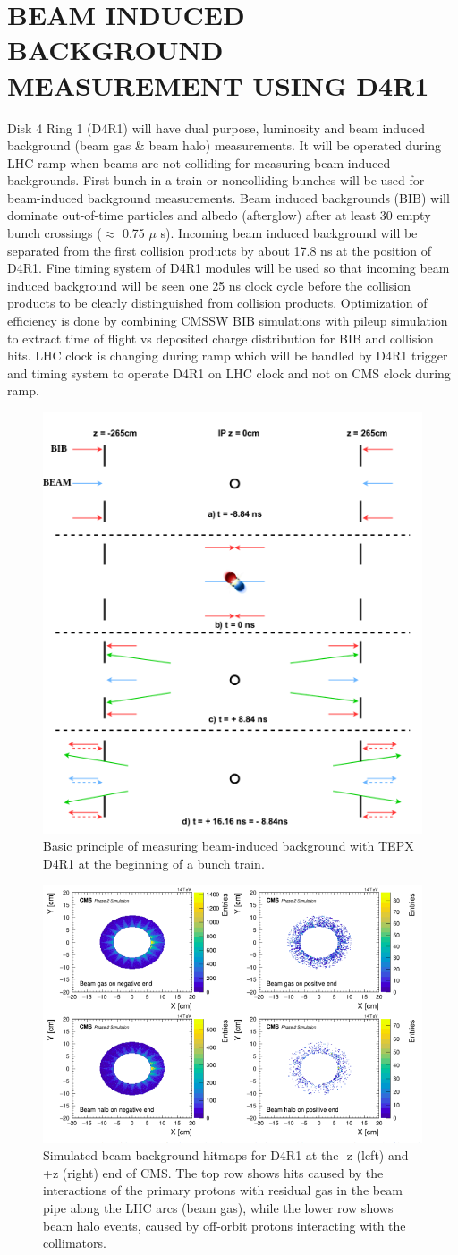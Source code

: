 \documentclass[a4paper,11pt]{article}
\begin{document}
\section{BEAM INDUCED BACKGROUND MEASUREMENT USING D4R1}
Disk 4 Ring 1 (D4R1) will have dual purpose, luminosity and beam induced background (beam gas \& beam halo) measurements. It will be operated during LHC ramp when beams are not colliding for measuring beam induced backgrounds. First bunch in a train or noncolliding bunches will be used for
beam-induced background measurements. Beam induced backgrounds (BIB) will dominate out-of-time particles and albedo (afterglow) after at least 30 empty bunch crossings ($\approx$ 0.75 $\mu$ s). Incoming beam induced background will be separated from the first
collision products by about 17.8 ns at the position of D4R1. Fine timing system of D4R1 modules will be used so that incoming beam induced background will be seen one 25 ns clock cycle before the collision products to be clearly distinguished from collision products.
Optimization of efficiency is done by combining CMSSW BIB simulations with pileup simulation to extract time of flight vs deposited
charge distribution for BIB and collision hits. LHC clock is changing during ramp which will be handled by D4R1 trigger and timing system to operate D4R1 on LHC clock and not on CMS clock during ramp.


\begin{figure}[htb]
  \centering
  \includegraphics[width=0.4\columnwidth]{BIB.png}
  \caption{Basic principle of measuring beam-induced background with TEPX D4R1 at the beginning of a bunch train. }
  \label{fig:CMS}
\end{figure}

\begin{figure}[htb]
  \centering
  \includegraphics[width=0.5\columnwidth]{bib_new.png}
  \caption{Simulated beam-background hitmaps for D4R1 at the -z (left) and +z (right) end of CMS. The top row shows hits caused by the interactions of the primary protons with residual gas in the beam pipe along the LHC arcs (beam gas), while the lower row shows beam halo events, caused by off-orbit protons interacting with the collimators.}
  \label{fig:CMS}
\end{figure}
\end{document}
